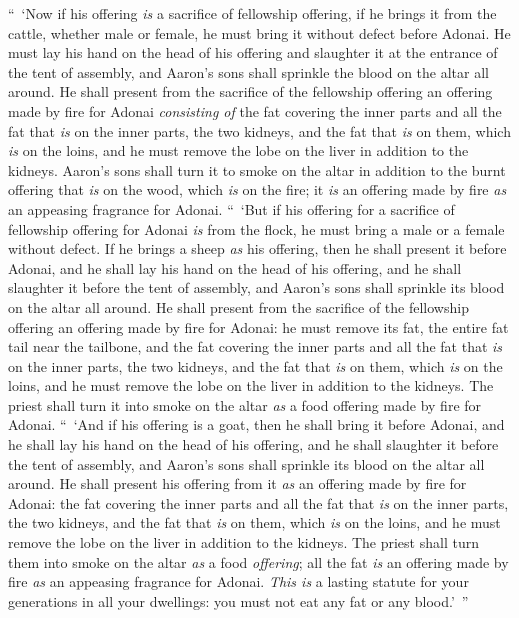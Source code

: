 \begin{biblechapter} %
 “ ‘Now if his offering \textit{is} a sacrifice of fellowship offering, if he brings it from the cattle, whether male or female, he must bring it without defect before Adonai.
\verse He must lay his hand on the head of his offering and slaughter it at the entrance of the tent of assembly, and Aaron’s sons shall sprinkle the blood on the altar all around.
\verse He shall present from the sacrifice of the fellowship offering an offering made by fire for Adonai \textit{consisting of} the fat covering the inner parts and all the fat that \textit{is} on the inner parts,
\verse the two kidneys, and the fat that \textit{is} on them, which \textit{is} on the loins, and he must remove the lobe on the liver in addition to the kidneys.
\verse Aaron’s sons shall turn it to smoke on the altar in addition to the burnt offering that \textit{is} on the wood, which \textit{is} on the fire; it \textit{is} an offering made by fire \textit{as} an appeasing fragrance for Adonai.
\verse “ ‘But if his offering for a sacrifice of fellowship offering for Adonai \textit{is} from the flock, he must bring a male or a female without defect.
\verse If he brings a sheep \textit{as} his offering, then he shall present it before Adonai,
\verse and he shall lay his hand on the head of his offering, and he shall slaughter it before the tent of assembly, and Aaron’s sons shall sprinkle its blood on the altar all around.
\verse He shall present from the sacrifice of the fellowship offering an offering made by fire for Adonai: he must remove its fat, the entire fat tail near the tailbone, and the fat covering the inner parts and all the fat that \textit{is} on the inner parts,
\verse the two kidneys, and the fat that \textit{is} on them, which \textit{is} on the loins, and he must remove the lobe on the liver in addition to the kidneys.
\verse The priest shall turn it into smoke on the altar \textit{as} a food offering made by fire for Adonai.
\verse “ ‘And if his offering is a goat, then he shall bring it before Adonai,
\verse and he shall lay his hand on the head of his offering, and he shall slaughter it before the tent of assembly, and Aaron’s sons shall sprinkle its blood on the altar all around.
\verse He shall present his offering from it \textit{as} an offering made by fire for Adonai: the fat covering the inner parts and all the fat that \textit{is} on the inner parts,
\verse the two kidneys, and the fat that \textit{is} on them, which \textit{is} on the loins, and he must remove the lobe on the liver in addition to the kidneys.
\verse The priest shall turn them into smoke on the altar \textit{as} a food \textit{offering}; all the fat \textit{is} an offering made by fire \textit{as} an appeasing fragrance for Adonai.
\verse \textit{This is} a lasting statute for your generations in all your dwellings: you must not eat any fat or any blood.’ ”
\end{biblechapter}

